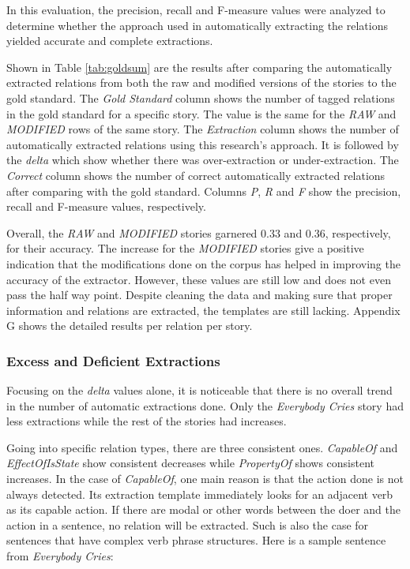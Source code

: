 In this evaluation, the precision, recall and F-measure values were analyzed to determine whether the approach used in automatically extracting the  relations yielded accurate and complete extractions.

Shown in Table \ref{tab:goldsum} are the results after comparing the automatically extracted relations from both the raw and modified versions of the stories to the gold standard. The \textit{Gold Standard} column shows the number of tagged relations in the gold standard for a specific story. The value is the same for the \textit{RAW} and \textit{MODIFIED} rows of the same story. The \textit{Extraction} column shows the number of automatically extracted relations using this research's approach. It is followed by the \textit{delta} which show whether there was over-extraction or under-extraction. The \textit{Correct} column shows the number of correct automatically extracted relations after comparing with the gold standard. Columns \textit{P}, \textit{R} and \textit{F} show the precision, recall and F-measure values, respectively.

Overall, the \textit{RAW} and \textit{MODIFIED} stories garnered 0.33 and 0.36, respectively, for their accuracy. The increase for the \textit{MODIFIED} stories give a positive indication that the modifications done on the corpus has helped in improving the accuracy of the extractor. However, these values are still low and does not even pass the half way point. Despite cleaning the data and making sure that proper information and relations are extracted, the templates are still lacking. Appendix G shows the detailed results per relation per story.

\subsubsection*{Excess and Deficient Extractions}

Focusing on the \textit{delta} values alone, it is noticeable that there is no overall trend in the number of automatic extractions done. Only the \textit{Everybody Cries} story had less extractions while the rest of the stories had increases.  

Going into specific relation types, there are three consistent ones. \textit{CapableOf} and \textit{EffectOfIsState} show consistent decreases while \textit{PropertyOf} shows consistent increases. In the case of \textit{CapableOf}, one main reason is that the action done is not always detected. Its extraction template immediately looks for an adjacent verb as its capable action. If there are modal or other words between the doer and the action in a sentence, no relation will be extracted. Such is also the case for sentences that have complex verb phrase structures. Here is a sample sentence from \textit{Everybody Cries}:

